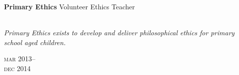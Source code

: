 \begin{minipage}[t]{0.75\textwidth}
\textbf{Primary Ethics}\phantom{..} Volunteer Ethics Teacher \\
\\
{\small
\textit{Primary Ethics exists to develop and deliver philosophical ethics for primary school aged children.}
\par}
\end{minipage}
\begin{minipage}[t]{0.25\textwidth}
{
\hfill \textsc{mar} 2013--\\ 
\hspace*{0pt} \hfill \textsc{dec} 2014
\par
}
\end{minipage}


